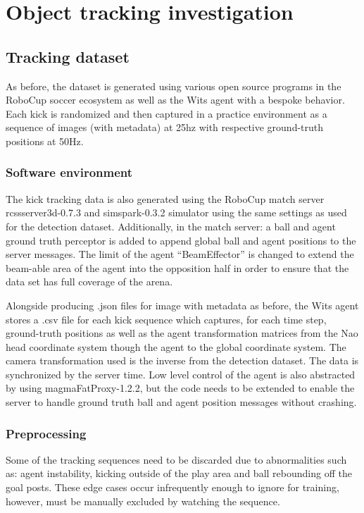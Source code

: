 \documentclass[a4paper,twoside,12pt]{report}
\begin{document}
\chapter{Object tracking investigation}

\section{Tracking dataset}
As before, the dataset is generated using various open source programs in the RoboCup soccer ecosystem as well as the Wits agent with a bespoke behavior. Each kick is randomized and then captured in a practice environment as a sequence of images (with metadata) at 25hz with respective ground-truth positions at 50Hz.

\subsection{Software environment}
The kick tracking data is also generated using the RoboCup match server rcssserver3d-0.7.3 and simspark-0.3.2 simulator using the same settings as used for the detection dataset. Additionally, in the match server: a ball and agent ground truth perceptor is added to append global ball and agent positions to the server messages. The limit of the agent ``BeamEffector'' is changed to extend the beam-able area of the agent into the opposition half in order to ensure that the data set has full coverage of the arena.

Alongside producing .json files for image with metadata as before, the Wits agent stores a .csv file for each kick sequence which captures, for each time step, ground-truth positions as well as the agent transformation matrices from the Nao head coordinate system though the agent to the global coordinate system. The camera transformation used is the inverse from the detection dataset. The data is synchronized by the server time. Low level control of the agent is also abstracted by using magmaFatProxy-1.2.2, but the code needs to be extended to enable the server to handle ground truth ball and agent position messages without crashing. 

\subsection{Preprocessing}

Some of the tracking sequences need to be discarded due to abnormalities such as: agent instability, kicking outside of the play area and ball rebounding off the goal posts. These edge cases occur infrequently enough to ignore for training, however, must be manually excluded by watching the sequence. 
\end{document}
